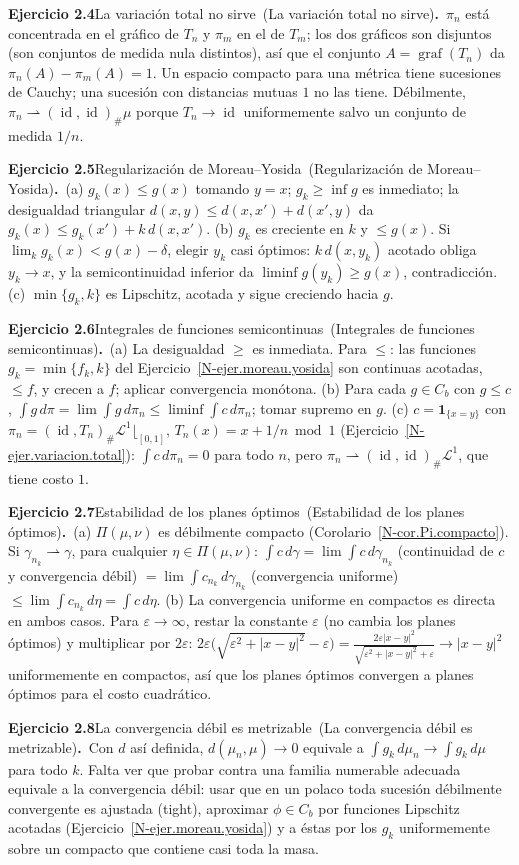 \documentclass[11pt,a4paper]{amsart}
\newcommand{\id}{\operatorname{id}}
\newcommand{\ve}{\varepsilon}
\newcommand{\LL}{{\mathcal L}}
\newcommand{\I}{{\mathbf 1}}
\theoremstyle{remark}
\theoremstyle{definition}
\numberwithin{subsection}{section}
\numberwithin{equation}{section}
\newcommand{\ejlabel}[2]{\par\medskip\noindent\textbf{Ejercicio #1}\ifx\relax#2\relax\else\ (#2)\fi\textbf{.}\ }
\begin{document}
\ejlabel{2.4}{La variación total no sirve}$\pi_n$ está concentrada en el gráfico de $T_n$ y $\pi_m$ en el de $T_m$; los dos gráficos son disjuntos (son conjuntos de medida nula distintos), así que el conjunto $A=\operatorname{graf}(T_n)$ da $\pi_n(A)-\pi_m(A)=1$. Un espacio compacto para una métrica tiene sucesiones de Cauchy; una sucesión con distancias mutuas $1$ no las tiene. Débilmente, $\pi_n\rightharpoonup(\id,\id)_\#\mu$ porque $T_n\to\id$ uniformemente salvo un conjunto de medida $1/n$.

\ejlabel{2.5}{Regularización de Moreau--Yosida}(a) $g_k(x)\le g(x)$ tomando $y=x$; $g_k\ge\inf g$ es inmediato; la desigualdad triangular $d(x,y)\le d(x,x')+d(x',y)$ da $g_k(x)\le g_k(x')+k\,d(x,x')$. (b) $g_k$ es creciente en $k$ y $\le g(x)$. Si $\lim_kg_k(x)<g(x)-\delta$, elegir $y_k$ casi óptimos: $k\,d(x,y_k)$ acotado obliga $y_k\to x$, y la semicontinuidad inferior da $\liminf g(y_k)\ge g(x)$, contradicción. (c) $\min\{g_k,k\}$ es Lipschitz, acotada y sigue creciendo hacia $g$.

\ejlabel{2.6}{Integrales de funciones semicontinuas}(a) La desigualdad $\ge$ es inmediata. Para $\le$: las funciones $g_k=\min\{f_k,k\}$ del Ejercicio~\ref{N-ejer.moreau.yosida} son continuas acotadas, $\le f$, y crecen a $f$; aplicar convergencia monótona. (b) Para cada $g\in C_b$ con $g\le c$, $\int g\,d\pi=\lim\int g\,d\pi_n\le\liminf\int c\,d\pi_n$; tomar supremo en $g$. (c) $c=\I_{\{x=y\}}$ con $\pi_n=(\id,T_n)_\#\LL^1\lfloor_{[0,1]}$, $T_n(x)=x+1/n \bmod 1$ (Ejercicio~\ref{N-ejer.variacion.total}): $\int c\,d\pi_n=0$ para todo $n$, pero $\pi_n\rightharpoonup(\id,\id)_\#\LL^1$, que tiene costo $1$.

\ejlabel{2.7}{Estabilidad de los planes óptimos}(a) $\Pi(\mu,\nu)$ es débilmente compacto (Corolario~\ref{N-cor.Pi.compacto}). Si $\gamma_{n_k}\rightharpoonup\gamma$, para cualquier $\eta\in\Pi(\mu,\nu)$: $\int c\,d\gamma=\lim\int c\,d\gamma_{n_k}$ (continuidad de $c$ y convergencia débil) $=\lim\int c_{n_k}\,d\gamma_{n_k}$ (convergencia uniforme) $\le\lim\int c_{n_k}\,d\eta=\int c\,d\eta$. (b) La convergencia uniforme en compactos es directa en ambos casos. Para $\ve\to\infty$, restar la constante $\ve$ (no cambia los planes óptimos) y multiplicar por $2\ve$: $2\ve\bigl(\sqrt{\ve^2+|x-y|^2}-\ve\bigr)=\frac{2\ve|x-y|^2}{\sqrt{\ve^2+|x-y|^2}+\ve}\to|x-y|^2$ uniformemente en compactos, así que los planes óptimos convergen a planes óptimos para el costo cuadrático.

\ejlabel{2.8}{La convergencia débil es metrizable}Con $d$ así definida, $d(\mu_n,\mu)\to0$ equivale a $\int g_k\,d\mu_n\to\int g_k\,d\mu$ para todo $k$. Falta ver que probar contra una familia numerable adecuada equivale a la convergencia débil: usar que en un polaco toda sucesión débilmente convergente es ajustada (tight), aproximar $\phi\in C_b$ por funciones Lipschitz acotadas (Ejercicio~\ref{N-ejer.moreau.yosida}) y a éstas por los $g_k$ uniformemente sobre un compacto que contiene casi toda la masa.
\end{document}
